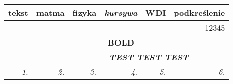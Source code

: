 \begin{table}[h]
\begin{tabular}{|cccccc|}
\hline
\multicolumn{1}{|l|}{\textbf{tekst}} &
  \multicolumn{1}{c|}{matma} &
  \multicolumn{1}{c|}{fizyka} &
  \multicolumn{1}{c|}{\textit{kursywa}} &
  \multicolumn{1}{c|}{\textbf{WDI}} &
  podkreślenie \\ \hline
\multicolumn{6}{|r|}{12345}                                                                                                            \\ \hline
\multicolumn{1}{|c|}{} & \multicolumn{1}{c|}{} & \multicolumn{1}{c|}{} & \multicolumn{1}{c|}{\textbf{BOLD}} & \multicolumn{1}{c|}{} &  \\ \hline
\multicolumn{2}{|c|}{}                         & \multicolumn{4}{c|}{{\ul \textit{\textbf{TEST TEST TEST}}}}                           \\ \hline
\multicolumn{1}{|r|}{\textit{1.}} &
  \multicolumn{1}{r|}{\textit{2.}} &
  \multicolumn{1}{r|}{\textit{3.}} &
  \multicolumn{1}{r|}{\textit{4.}} &
  \multicolumn{1}{r|}{\textit{5.}} &
  \multicolumn{1}{r|}{\textit{6.}} \\ \hline
\end{tabular}
\end{table}